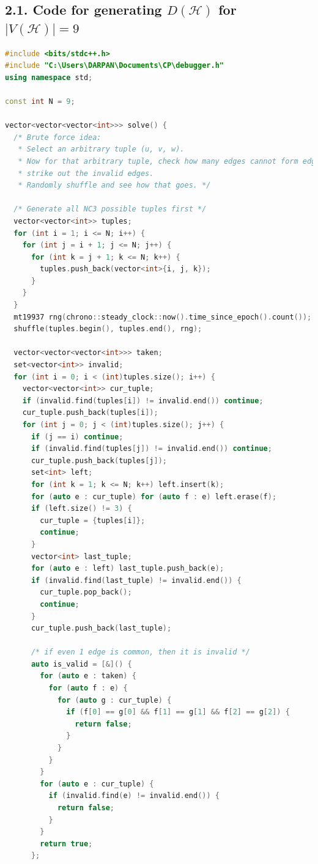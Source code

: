 \documentclass[11pt]{article}
\begin{document}
\subsection*{2.1. Code for generating $D(\mathcal{H})$ for $|V(\mathcal{H})|=9$}
\begin{lstlisting}[language=C++]
#include <bits/stdc++.h>
#include "C:\Users\DARPAN\Documents\CP\debugger.h"
using namespace std;

const int N = 9;

vector<vector<vector<int>>> solve() {
  /* Brute force idea:
   * Select an arbitrary tuple (u, v, w).
   * Now for that arbitrary tuple, check how many edges cannot form edges anymore, in other words
   * strike out the invalid edges.
   * Randomly shuffle and see how that goes. */

  /* Generate all NC3 possible tuples first */
  vector<vector<int>> tuples;
  for (int i = 1; i <= N; i++) {
    for (int j = i + 1; j <= N; j++) {
      for (int k = j + 1; k <= N; k++) {
        tuples.push_back(vector<int>{i, j, k});
      }
    }
  }
  mt19937 rng(chrono::steady_clock::now().time_since_epoch().count()); /* random generator */
  shuffle(tuples.begin(), tuples.end(), rng);

  vector<vector<vector<int>>> taken;
  set<vector<int>> invalid;
  for (int i = 0; i < (int)tuples.size(); i++) {
    vector<vector<int>> cur_tuple;
    if (invalid.find(tuples[i]) != invalid.end()) continue;
    cur_tuple.push_back(tuples[i]);
    for (int j = 0; j < (int)tuples.size(); j++) {
      if (j == i) continue;
      if (invalid.find(tuples[j]) != invalid.end()) continue;
      cur_tuple.push_back(tuples[j]);
      set<int> left;
      for (int k = 1; k <= N; k++) left.insert(k);
      for (auto e : cur_tuple) for (auto f : e) left.erase(f);
      if (left.size() != 3) {
        cur_tuple = {tuples[i]};
        continue;
      }
      vector<int> last_tuple;
      for (auto e : left) last_tuple.push_back(e);
      if (invalid.find(last_tuple) != invalid.end()) {
        cur_tuple.pop_back();
        continue;
      }
      cur_tuple.push_back(last_tuple);

      /* if even 1 edge is common, then it is invalid */
      auto is_valid = [&]() {
        for (auto e : taken) {
          for (auto f : e) {
            for (auto g : cur_tuple) {
              if (f[0] == g[0] && f[1] == g[1] && f[2] == g[2]) {
                return false;
              }
            }
          }
        }
        for (auto e : cur_tuple) {
          if (invalid.find(e) != invalid.end()) {
            return false;
          }
        }
        return true;
      };


\end{lstlisting}
\end{document}
